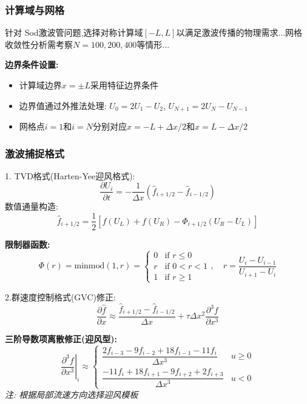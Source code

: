 \documentclass[UTF8]{ctexart}
\begin{document}
\subsubsection{计算域与网格}
针对 Sod激波管问题,选择对称计算域$[-L, L]$以满足激波传播的物理需求...网格收敛性分析需考察$N=100,200,400$等情形...

\textbf{边界条件设置:}
\begin{itemize}
    \item 计算域边界$x = \pm L$采用特征边界条件
    \item 边界值通过外推法处理: $U_0 = 2U_1 - U_2$, $U_{N+1} = 2U_N - U_{N-1}$
    \item 网格点$i=1$和$i=N$分别对应$x = -L + \Delta x / 2$和$x = L - \Delta x / 2$
\end{itemize}

\subsubsection{激波捕捉格式}
1. TVD格式(Harten-Yee迎风格式):
$$\frac{\partial U_i}{\partial t} = -\frac{1}{\Delta x}\left(\hat{f}_{i+1/2} - \hat{f}_{i-1/2}\right)$$
数值通量构造:
$$\hat{f}_{i+1/2} = \frac{1}{2}\left[f(U_L) + f(U_R) - \Phi_{i+1/2}(U_R - U_L)\right]$$

\textbf{限制器函数:}
$$\Phi(r) = \text{minmod}(1, r) = 
\begin{cases} 
0 & \text{if } r \leq 0 \\
r & \text{if } 0 < r < 1 \\
1 & \text{if } r \geq 1 
\end{cases}, \quad r = \frac{U_i - U_{i-1}}{U_{i+1} - U_i}$$

2.群速度控制格式(GVC)修正:
$$\frac{\partial\hat{f}}{\partial x} \approx \frac{\hat{f}_{i+1/2} - \hat{f}_{i-1/2}}{\Delta x} + \tau\Delta x^2\frac{\partial^3 f}{\partial x^3}$$

\textbf{三阶导数项离散修正(迎风型):}
$$\left.\frac{\partial^3 f}{\partial x^3}\right|_i \approx 
\begin{cases}
\dfrac{2f_{i-3} - 9f_{i-2} + 18f_{i-1} - 11f_i}{\Delta x^3} & u \geq 0 \\
\dfrac{-11f_i + 18f_{i+1} - 9f_{i+2} + 2f_{i+3}}{\Delta x^3} & u < 0
\end{cases}$$
\textit{注: 根据局部流速方向选择迎风模板}
\end{document}
